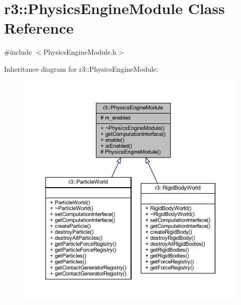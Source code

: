 \hypertarget{classr3_1_1_physics_engine_module}{}\section{r3\+:\+:Physics\+Engine\+Module Class Reference}
\label{classr3_1_1_physics_engine_module}


{\ttfamily \#include $<$Physics\+Engine\+Module.\+h$>$}



Inheritance diagram for r3\+:\+:Physics\+Engine\+Module\+:\nopagebreak
\begin{figure}[H]
\begin{center}
\leavevmode
\includegraphics[width=350pt]{classr3_1_1_physics_engine_module__inherit__graph}
\end{center}
\end{figure}


